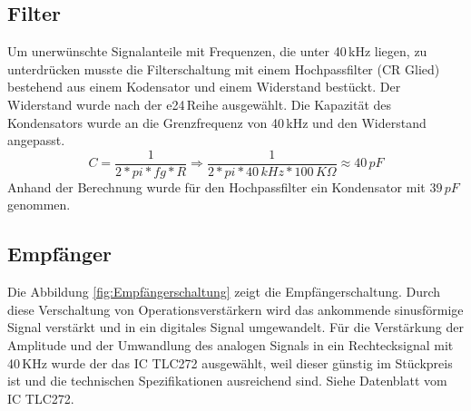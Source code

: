 \subsection{Filter}%
Um unerwünschte Signalanteile mit Frequenzen, die unter 40\,kHz liegen, zu unterdrücken musste die Filterschaltung mit einem Hochpassfilter (CR Glied) bestehend aus einem Kodensator und einem Widerstand bestückt. Der Widerstand wurde nach der e24\,Reihe ausgewählt.
Die Kapazität des Kondensators wurde an die Grenzfrequenz von 40\,kHz und den Widerstand angepasst.
\onehalfspacing \\
\[\displaystyle C=\frac{1}{2*pi*fg*R}\Rightarrow\frac{1}{2*pi*40\,kHz*100\,K\Omega}\approx40\,pF \]
\singlespacing
Anhand der Berechnung wurde für den Hochpassfilter ein Kondensator mit \(\displaystyle 39\,pF\) genommen.

\subsection{Empfänger}
Die Abbildung \ref{fig:Empfängerschaltung} zeigt die Empfängerschaltung. Durch diese Verschaltung von Operationsverstärkern wird das ankommende sinusförmige Signal verstärkt und in ein digitales Signal umgewandelt. Für die Verstärkung der Amplitude und der Umwandlung des analogen Signals in ein Rechtecksignal mit 40\,KHz wurde der das IC TLC272 ausgewählt, weil dieser günstig im Stückpreis ist und die technischen Spezifikationen ausreichend sind. Siehe Datenblatt vom IC TLC272.\\

